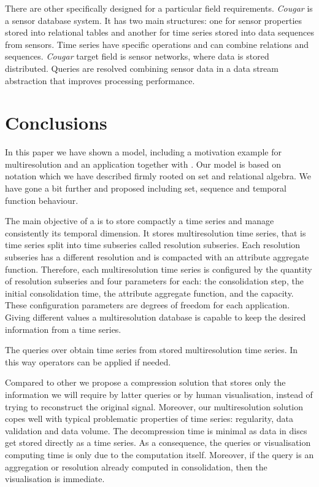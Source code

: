 There are other  specifically designed for a particular
field requirements.  \emph{Cougar}
\cite{bonnet01} is a sensor database system. It has two main
structures: one for sensor properties stored into relational tables
and another for time series stored into data sequences from
sensors. Time series have specific operations and can combine
relations and sequences. \emph{Cougar} target field is sensor networks, where
data is stored distributed. Queries are resolved combining
sensor data in a data stream abstraction that improves processing
performance.






\section{Conclusions}
\label{sec:concl-future-work}


In this paper we have shown a  model, including a
motivation example for multiresolution and an application together
with . Our  model is based on 
notation which we have described firmly rooted on set and relational
algebra. We have gone a bit further and proposed  including
set, sequence and temporal function behaviour.



The main objective of a  is to store compactly a time
series and manage consistently its temporal dimension.  It stores
multiresolution time series, that is time series split into time
subseries called resolution subseries.  Each resolution subseries has
a different resolution and is compacted with an attribute aggregate
function. Therefore, each multiresolution time series is configured by
the quantity of resolution subseries and four parameters for each: the
consolidation step, the initial consolidation time, the attribute
aggregate function, and the capacity.  These configuration parameters
are degrees of freedom for each application. Giving different
values a multiresolution database is capable to keep the desired
information from a time series.



The queries over  obtain time series from stored
multiresolution time series. In this way  operators can be
applied if needed.


Compared to other  we propose a compression solution that
stores only the information we will require by latter queries or by
human visualisation, instead of trying to reconstruct the original
signal.  Moreover, our multiresolution solution copes well with
typical problematic properties of time series: regularity, data
validation and data volume.  The decompression time is minimal as data
in discs get stored directly as a time series. As a consequence, the
queries or visualisation computing time is only due to the computation
itself. Moreover, if the query is an aggregation or resolution already
computed in  consolidation, then the visualisation is
immediate.



